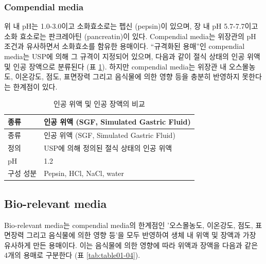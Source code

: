\documentclass[
  11pt,
  krantz2, a4paper, twoside]{krantz}
\begin{document}
\subsubsection{Compendial media}\label{compendial-media}

위 내 pH는 1.0-3.0이고 소화효소로는 펩신 (pepsin)이 있으며, 장 내 pH 5.7-7.7이고 소화 효소로는 판크레아틴 (pancreatin)이 있다. Compendial media는 위장관의 pH 조건과 유사하면서 소화효소를 함유한 용매이다.
``규격화된 용매''인 compendial media는 USP에 의해 그 규격이 지정되어
있으며, 다음과 같이 절식 상태의 인공 위액 및 인공 장액으로 분류된다 (표 \ref{tab:table01-03}).
하지만 compendial media는 위장관 내 오스몰농도, 이온강도, 점도, 표면장력 그리고 음식물에 의한 영향 등을 충분히 반영하지 못한다는 한계점이 있다.

\begin{longtable}[]{@{}ll@{}}
\caption{\label{tab:table01-03} 인공 위액 및 인공 장액의 비교}\tabularnewline
\toprule\noalign{}
종류 & 인공 위액 (SGF, Simulated Gastric Fluid) \\
\midrule\noalign{}
\endfirsthead
\toprule\noalign{}
종류 & 인공 위액 (SGF, Simulated Gastric Fluid) \\
\midrule\noalign{}
\endhead
\bottomrule\noalign{}
\endlastfoot
정의 & USP에 의해 정의된 절식 상태의 인공 위액 \\
pH & 1.2 \\
구성 성분 & Pepsin, HCl, NaCl, water \\
\end{longtable}

\subsection{Bio-relevant media}\label{bio-relevant-media}

Bio-relevant media는 compendial media의 한계점인 '오스몰농도, 이온강도,
점도, 표면장력 그리고 음식물에 의한 영향 등'을 모두 반영하여 생체 내
위액 및 장액과 가장 유사하게 만든 용매이다. 이는 음식물에 의한 영향에
따라 위액과 장액을 다음과 같은 4개의 용매로 구분한다 (표 \ref{tab:table01-04}).
\end{document}
